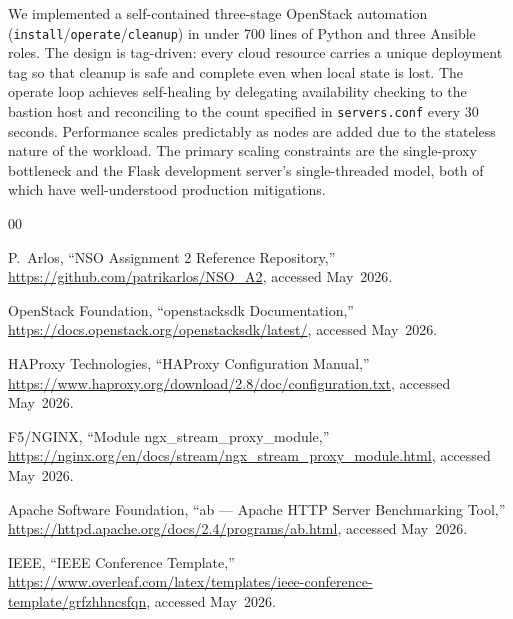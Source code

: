 \documentclass[conference]{IEEEtran}
\begin{document}
We implemented a self-contained three-stage OpenStack automation
(\texttt{install}/\texttt{operate}/\texttt{cleanup}) in under 700
lines of Python and three Ansible roles.  The design is tag-driven:
every cloud resource carries a unique deployment tag so that cleanup
is safe and complete even when local state is lost.  The operate loop
achieves self-healing by delegating availability checking to the
bastion host and reconciling to the count specified in
\texttt{servers.conf} every 30 seconds.  Performance scales
predictably as nodes are added due to the stateless nature of the
workload.  The primary scaling constraints are the single-proxy
bottleneck and the Flask development server's single-threaded model,
both of which have well-understood production mitigations.


\begin{thebibliography}{00}

P.~Arlos, ``NSO Assignment 2 Reference Repository,''
\url{https://github.com/patrikarlos/NSO_A2}, accessed May~2026.

OpenStack Foundation, ``openstacksdk Documentation,''
\url{https://docs.openstack.org/openstacksdk/latest/}, accessed May~2026.

HAProxy Technologies, ``HAProxy Configuration Manual,''
\url{https://www.haproxy.org/download/2.8/doc/configuration.txt},
accessed May~2026.

F5/NGINX, ``Module ngx\_stream\_proxy\_module,''
\url{https://nginx.org/en/docs/stream/ngx_stream_proxy_module.html},
accessed May~2026.

Apache Software Foundation, ``ab — Apache HTTP Server Benchmarking Tool,''
\url{https://httpd.apache.org/docs/2.4/programs/ab.html},
accessed May~2026.

IEEE, ``IEEE Conference Template,''
\url{https://www.overleaf.com/latex/templates/ieee-conference-template/grfzhhncsfqn},
accessed May~2026.

\end{thebibliography}
\end{document}
